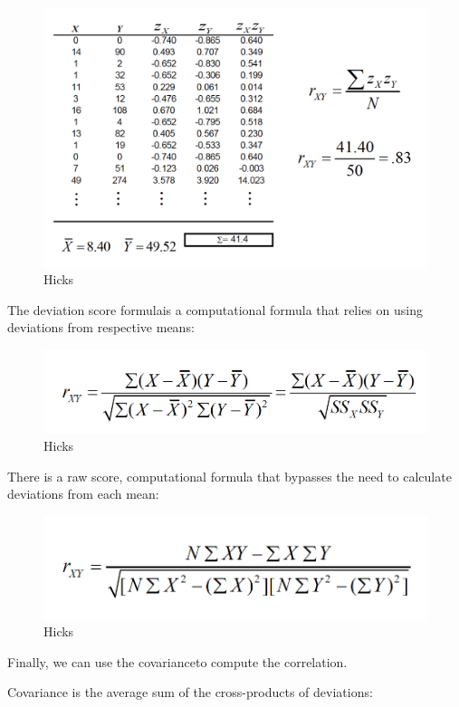 \documentclass[]{book}
\theoremstyle{definition}
\theoremstyle{definition}
\theoremstyle{definition}
\theoremstyle{remark}
\begin{document}
{\begin{figure}
\centering
\includegraphics{img/hickscor7.png}
\caption{Hicks}
\end{figure}

The deviation score formulais a computational formula that relies on
using deviations from respective means:

\begin{figure}
\centering
\includegraphics{img/hickscor8.png}
\caption{Hicks}
\end{figure}

There is a raw score, computational formula that bypasses the need to
calculate deviations from each mean:

\begin{figure}
\centering
\includegraphics{img/hickscor9.png}
\caption{Hicks}
\end{figure}

Finally, we can use the covarianceto compute the correlation.

Covariance is the average sum of the cross-products of deviations:

}
\end{document}
